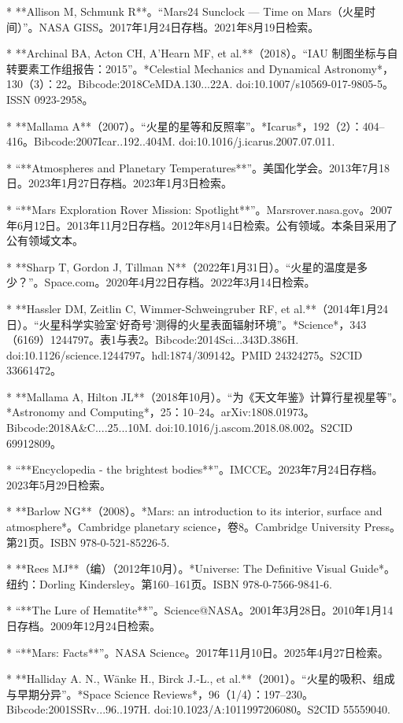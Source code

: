 * **Allison M, Schmunk R**。“Mars24 Sunclock — Time on Mars（火星时间）”。NASA GISS。2017年1月24日存档。2021年8月19日检索。

* **Archinal BA, Acton CH, A'Hearn MF, et al.**（2018）。“IAU 制图坐标与自转要素工作组报告：2015”。*Celestial Mechanics and Dynamical Astronomy*，130（3）：22。Bibcode:2018CeMDA.130...22A. doi:10.1007/s10569-017-9805-5。ISSN 0923-2958。

* **Mallama A**（2007）。“火星的星等和反照率”。*Icarus*，192（2）：404–416。Bibcode:2007Icar..192..404M. doi:10.1016/j.icarus.2007.07.011.

* “**Atmospheres and Planetary Temperatures**”。美国化学会。2013年7月18日。2023年1月27日存档。2023年1月3日检索。

* “**Mars Exploration Rover Mission: Spotlight**”。Marsrover.nasa.gov。2007年6月12日。2013年11月2日存档。2012年8月14日检索。公有领域。本条目采用了公有领域文本。

* **Sharp T, Gordon J, Tillman N**（2022年1月31日）。“火星的温度是多少？”。Space.com。2020年4月22日存档。2022年3月14日检索。

* **Hassler DM, Zeitlin C, Wimmer-Schweingruber RF, et al.**（2014年1月24日）。“火星科学实验室‘好奇号’测得的火星表面辐射环境”。*Science*，343（6169）1244797。表1与表2。Bibcode:2014Sci...343D.386H. doi:10.1126/science.1244797。hdl:1874/309142。PMID 24324275。S2CID 33661472。

* **Mallama A, Hilton JL**（2018年10月）。“为《天文年鉴》计算行星视星等”。*Astronomy and Computing*，25：10–24。arXiv:1808.01973。Bibcode:2018A&C....25...10M. doi:10.1016/j.ascom.2018.08.002。S2CID 69912809。

* “**Encyclopedia - the brightest bodies**”。IMCCE。2023年7月24日存档。2023年5月29日检索。

* **Barlow NG**（2008）。*Mars: an introduction to its interior, surface and atmosphere*。Cambridge planetary science，卷8。Cambridge University Press。第21页。ISBN 978-0-521-85226-5.

* **Rees MJ**（编）（2012年10月）。*Universe: The Definitive Visual Guide*。纽约：Dorling Kindersley。第160–161页。ISBN 978-0-7566-9841-6.

* “**The Lure of Hematite**”。Science@NASA。2001年3月28日。2010年1月14日存档。2009年12月24日检索。

* “**Mars: Facts**”。NASA Science。2017年11月10日。2025年4月27日检索。

* **Halliday A. N., Wänke H., Birck J.-L., et al.**（2001）。“火星的吸积、组成与早期分异”。*Space Science Reviews*，96（1/4）：197–230。Bibcode:2001SSRv...96..197H. doi:10.1023/A:1011997206080。S2CID 55559040.

